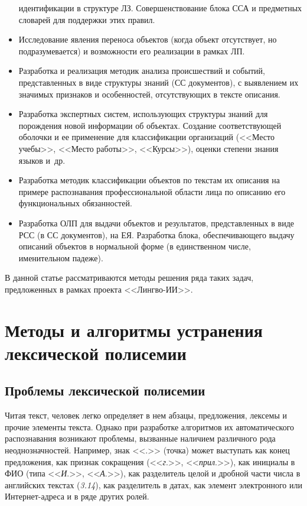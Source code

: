 \begin{multicols}{2}
\begin{itemize}
идентификации в структуре ЛЗ. Совершенствование 
блока ССА и предметных словарей  для поддержки этих правил. 
\item Исследование явления переноса объектов (когда объект отсутствует, но 
подразумевается) и возможности его реализации в рамках ЛП. 
\item Разработка и реализация методик анализа происшествий и событий, 
представленных в виде структуры знаний (СС документов), с выявлением их 
значимых признаков и особенностей, отсутствующих в тексте описания. 
\item Разработка экспертных систем, использующих\linebreak
структуры знаний для 
порождения новой информации об объектах. Создание соответ\-ст\-вующей 
оболочки и ее применение для клас\-сификации организаций (<<Место учебы>>, 
\mbox{<<Место} работы>>, <<Курсы>>), оценки степени знания языков и~др. 
\item Разработка методик классификации объектов по текстам их описания на 
примере распознавания профессиональной области лица по описанию его 
функциональных обязанностей. 
\item Разработка ОЛП для выдачи объектов 
и результатов, представленных в виде РСС (в СС документов), на ЕЯ. 
Разработка блока, обеспечивающего выдачу описаний объектов в нормальной 
форме (в единственном чис\-ле, именительном падеже). 
     \end{itemize}
     
     В данной статье рассматриваются методы решения ряда таких задач, 
предложенных в рамках проекта <<Лингво-ИИ>>. 

\section{Методы и алгоритмы устранения лексической полисемии}

\subsection{Проблемы лексической полисемии}

     Читая текст, человек легко определяет в нем абзацы, предложения, 
лексемы и прочие элементы текста. Однако при разработке алгоритмов их 
автоматического распознавания возникают проблемы, вызванные наличием 
различного рода неоднозначностей. Например, знак <<.>> (точка) может 
выступать как конец предложения, как признак сокращения (<<\textit{г}.>>, 
<<\textit{прил}.>>), как инициалы в ФИО (типа <<\textit{И}.>>, <<\textit{А}.>>), 
как разделитель целой и дробной части чис\-ла в английских текстах
(\textit{3.14}), как разделитель в 
датах, как элемент электронного или Ин\-тер\-нет-ад\-ре\-са и в ряде других 
ролей. 
     

\end{multicols}
